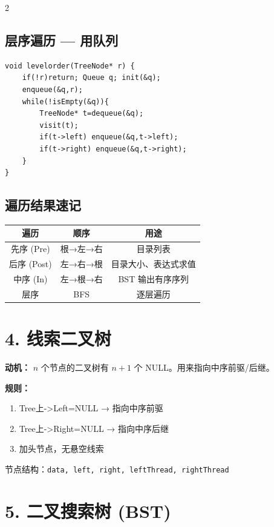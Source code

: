\documentclass[10pt,a4paper]{article}
\begin{document}
\begin{multicols}{2}
\subsection*{层序遍历 — 用队列}

\begin{lstlisting}
void levelorder(TreeNode* r) {
    if(!r)return; Queue q; init(&q);
    enqueue(&q,r);
    while(!isEmpty(&q)){
        TreeNode* t=dequeue(&q);
        visit(t);
        if(t->left) enqueue(&q,t->left);
        if(t->right) enqueue(&q,t->right);
    }
}
\end{lstlisting}

\subsection*{遍历结果速记}

\begin{center}\small
\begin{tabular}{|c|c|c|}
\hline
\textbf{遍历} & \textbf{顺序} & \textbf{用途} \\
\hline
先序 (Pre) & 根→左→右 & 目录列表 \\
后序 (Post) & 左→右→根 & 目录大小、表达式求值 \\
中序 (In) & 左→根→右 & BST 输出有序序列 \\
层序 & BFS & 逐层遍历 \\
\hline
\end{tabular}
\end{center}

\section*{4. 线索二叉树}

\textbf{动机：} $n$ 个节点的二叉树有 $n+1$ 个 NULL。用来指向中序前驱/后继。

\textbf{规则：}
\begin{enumerate}
\item Tree上->Left=NULL → 指向中序前驱
\item Tree上->Right=NULL → 指向中序后继
\item 加头节点，无悬空线索
\end{enumerate}

节点结构：\texttt{data, left, right, leftThread, rightThread}

\section*{5. 二叉搜索树 (BST)}


\end{multicols}
\end{document}
